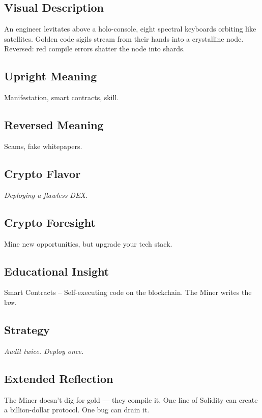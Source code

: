\documentclass[11pt,oneside]{book}
\begin{document}
\begin{minipage}[t]{0.55\textwidth}
  \vspace{0pt}

  \subsection*{Visual Description}
  An engineer levitates above a holo-console, eight spectral keyboards orbiting like satellites. Golden code sigils stream from their hands into a crystalline node. Reversed: red compile errors shatter the node into shards.

  \subsection*{Upright Meaning}
  Manifestation, smart contracts, skill.

  \subsection*{Reversed Meaning}
  Scams, fake whitepapers.

  \subsection*{Crypto Flavor}
  \textit{Deploying a flawless DEX.}

  \subsection*{Crypto Foresight}
  Mine new opportunities, but upgrade your tech stack.

  \subsection*{Educational Insight}
  Smart Contracts – Self-executing code on the blockchain. The Miner writes the law.

  \subsection*{Strategy}
  \textit{Audit twice. Deploy once.}

  \subsection*{Extended Reflection}
  The Miner doesn't dig for gold — they compile it. One line of Solidity can create a billion-dollar protocol. One bug can drain it.


\end{minipage}
\end{document}
